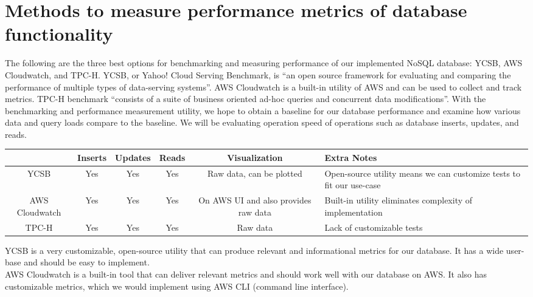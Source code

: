         \section{Methods to measure performance metrics of database functionality}
        The following are the three best options for benchmarking and measuring performance of our implemented NoSQL database: YCSB, AWS Cloudwatch, and TPC-H. YCSB, or Yahoo! Cloud Serving Benchmark, is “an open source framework for evaluating and comparing the performance of multiple types of data-serving systems”\cite{I1}. AWS Cloudwatch is a built-in utility of AWS and can be used to collect and track metrics. TPC-H benchmark “consists of a suite of business oriented ad-hoc queries and concurrent data modifications”\cite{I2}. With the benchmarking and performance measurement utility, we hope to obtain a baseline for our database performance and examine how various data and query loads compare to the baseline. We will be evaluating operation speed of operations such as database inserts, updates, and reads.
        
        \begin{table}[ht]
        \begin{tabular}{|c|c|c|c|c|p{5cm}|}
            \hline
            \textbf{} & \textbf{Inserts} & \textbf{Updates} & \textbf{Reads} & \textbf{Visualization} & \textbf{Extra Notes}\\
            \hline
            YCSB & Yes & Yes & Yes & Raw data, can be plotted & Open-source utility means we can customize tests to fit our use-case\\
            \hline
            AWS Cloudwatch & Yes & Yes & Yes & On AWS UI and also provides raw data & Built-in utility eliminates complexity of implementation\\
            \hline
            TPC-H & Yes & Yes & Yes & Raw data &Lack of customizable tests\\
            \hline
        \end{tabular}
        \end{table}
       
        \noindent YCSB is a very customizable, open-source utility that can produce relevant and informational metrics for our database. It has a wide user-base and should be easy to implement. \\
    
        \noindent AWS Cloudwatch is a built-in tool that can deliver relevant metrics and should work well with our database on AWS. It also has customizable metrics, which we would implement using AWS CLI (command line interface).\\ 
        
